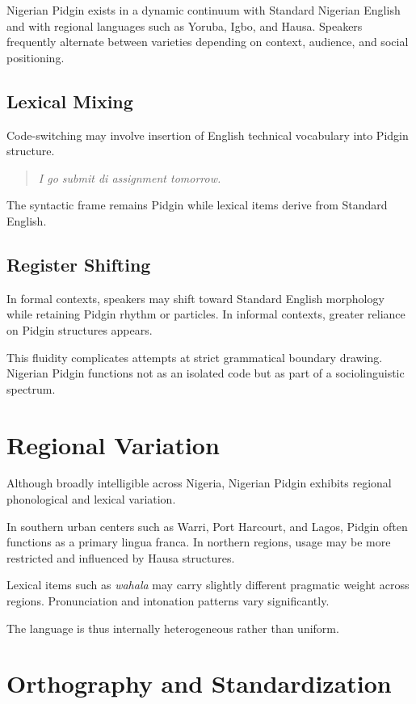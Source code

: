\documentclass[12pt]{article}
\begin{document}
Nigerian Pidgin exists in a dynamic continuum with Standard Nigerian English and with regional languages such as Yoruba, Igbo, and Hausa. Speakers frequently alternate between varieties depending on context, audience, and social positioning.

\subsection{Lexical Mixing}

Code-switching may involve insertion of English technical vocabulary into Pidgin structure.

\begin{quote}
\textit{I go submit di assignment tomorrow.}
\end{quote}

The syntactic frame remains Pidgin while lexical items derive from Standard English.

\subsection{Register Shifting}

In formal contexts, speakers may shift toward Standard English morphology while retaining Pidgin rhythm or particles. In informal contexts, greater reliance on Pidgin structures appears.

This fluidity complicates attempts at strict grammatical boundary drawing. Nigerian Pidgin functions not as an isolated code but as part of a sociolinguistic spectrum.

\section{Regional Variation}

Although broadly intelligible across Nigeria, Nigerian Pidgin exhibits regional phonological and lexical variation.

In southern urban centers such as Warri, Port Harcourt, and Lagos, Pidgin often functions as a primary lingua franca. In northern regions, usage may be more restricted and influenced by Hausa structures.

Lexical items such as \textit{wahala} may carry slightly different pragmatic weight across regions. Pronunciation and intonation patterns vary significantly.

The language is thus internally heterogeneous rather than uniform.

\section{Orthography and Standardization}
\end{document}
